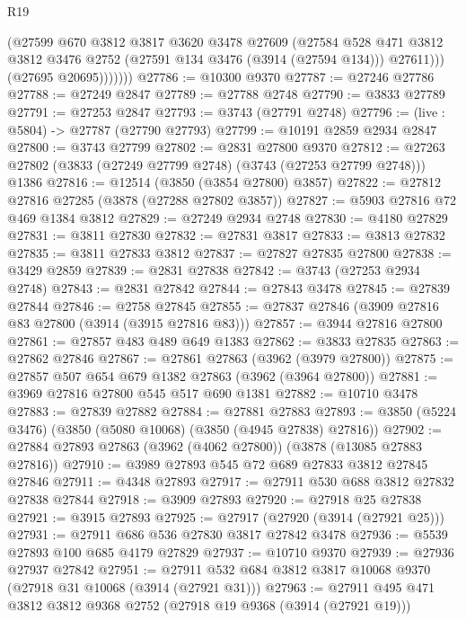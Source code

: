 \begin{lexlean}{R19}
\begin{coremodule}
                  (@27599
                    @670
                    @3812
                    @3817
                    @3620
                    @3478
                    @27609
                    (@27584
                      @528
                      @471
                      @3812
                      @3812
                      @3476
                      @2752
                      (@27591 @134 @3476 (@3914 (@27594 @134)))
                      @27611)))
                (@27695 @20695)))))))
@27786 := @10300 @9370
@27787 := @27246 @27786
@27788 := @27249 @2847
@27789 := @27788 @2748
@27790 := @3833 @27789
@27791 := @27253 @2847
@27793 := @3743 (@27791 @2748)
@27796 := (live : @5804) -> @27787 (@27790 @27793)
@27799 := @10191 @2859 @2934 @2847
@27800 := @3743 @27799
@27802 := @2831 @27800 @9370
@27812 := @27263 @27802 (@3833 (@27249 @27799 @2748) (@3743 (@27253 @27799 @2748))) @1386
@27816 := @12514 (@3850 (@3854 @27800) @3857)
@27822 := @27812 @27816 @27285 (@3878 (@27288 @27802 @3857))
@27827 := @5903 @27816 @72 @469 @1384 @3812
@27829 := @27249 @2934 @2748
@27830 := @4180 @27829
@27831 := @3811 @27830
@27832 := @27831 @3817
@27833 := @3813 @27832
@27835 := @3811 @27833 @3812
@27837 := @27827 @27835 @27800
@27838 := @3429 @2859
@27839 := @2831 @27838
@27842 := @3743 (@27253 @2934 @2748)
@27843 := @2831 @27842
@27844 := @27843 @3478
@27845 := @27839 @27844
@27846 := @2758 @27845
@27855 := @27837 @27846 (@3909 @27816 @83 @27800 (@3914 (@3915 @27816 @83)))
@27857 := @3944 @27816 @27800
@27861 := @27857 @483 @489 @649 @1383
@27862 := @3833 @27835
@27863 := @27862 @27846
@27867 := @27861 @27863 (@3962 (@3979 @27800))
@27875 := @27857 @507 @654 @679 @1382 @27863 (@3962 (@3964 @27800))
@27881 := @3969 @27816 @27800 @545 @517 @690 @1381
@27882 := @10710 @3478
@27883 := @27839 @27882
@27884 := @27881 @27883
@27893 := @3850 (@5224 @3476) (@3850 (@5080 @10068) (@3850 (@4945 @27838) @27816))
@27902 := @27884 @27893 @27863 (@3962 (@4062 @27800)) (@3878 (@13085 @27883 @27816))
@27910 := @3989 @27893 @545 @72 @689 @27833 @3812 @27845 @27846
@27911 := @4348 @27893
@27917 := @27911 @530 @688 @3812 @27832 @27838 @27844
@27918 := @3909 @27893
@27920 := @27918 @25 @27838
@27921 := @3915 @27893
@27925 := @27917 (@27920 (@3914 (@27921 @25)))
@27931 := @27911 @686 @536 @27830 @3817 @27842 @3478
@27936 := @5539 @27893 @100 @685 @4179 @27829
@27937 := @10710 @9370
@27939 := @27936 @27937 @27842
@27951 := @27911 @532 @684 @3812 @3817 @10068 @9370 (@27918 @31 @10068 (@3914 (@27921 @31)))
@27963 := @27911 @495 @471 @3812 @3812 @9368 @2752 (@27918 @19 @9368 (@3914 (@27921 @19)))

\end{coremodule}
\end{lexlean}
